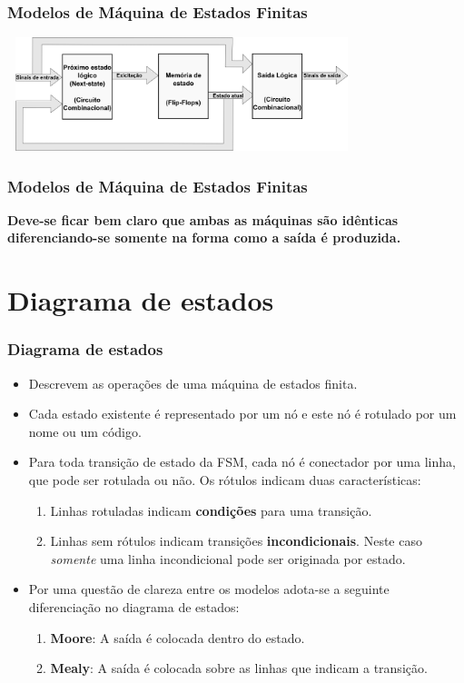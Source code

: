 \documentclass{beamer}
\begin{document}
\begin{frame}
  \frametitle{Modelos de Máquina de Estados Finitas}
  \includegraphics[height = 1.3in, width = 4in]{images/modelo_8.png}
\end{frame}

\begin{frame}
  \frametitle{Modelos de Máquina de Estados Finitas}
  \textbf{Deve-se ficar bem claro que ambas as máquinas são 
    idênticas diferenciando-se somente na forma como a saída é produzida.}
\end{frame}

\section{Diagrama de estados}

\begin{frame}
  \frametitle{Diagrama de estados}
  \begin{itemize}
    \item Descrevem as operações de uma máquina de estados finita.
      \pause
    \item Cada estado existente é representado por um nó e este nó é rotulado 
      por um nome ou um código.
      \pause
    \item Para toda transição de estado da FSM, cada nó é conectador por
      uma linha, que pode ser rotulada ou não. Os rótulos indicam duas 
      características:
      \pause
      \begin{enumerate}
        \item Linhas rotuladas indicam \textbf{condições} para uma 
          transição.
          \pause
        \item Linhas sem rótulos indicam transições \textbf{incondicionais}. 
          Neste caso \textit{somente} uma linha incondicional pode ser 
          originada por estado.
          \pause
      \end{enumerate}
    \item Por uma questão de clareza entre os modelos adota-se a
      seguinte diferenciação no diagrama de estados:
      \pause
      \begin{enumerate}
        \item \textbf{Moore}: A saída é colocada dentro do estado.
          \pause
        \item \textbf{Mealy}: A saída é colocada sobre as linhas que indicam a 
          transição.
      \end{enumerate}
  \end{itemize}
\end{frame}
\end{document}
